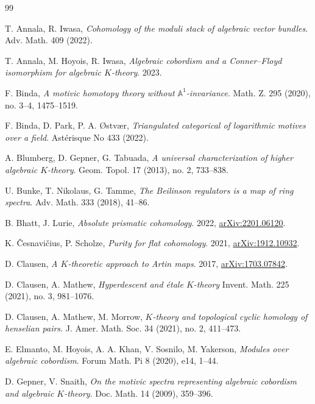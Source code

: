 \documentclass{amsart}
\theoremstyle{plain}
\theoremstyle{definition}
\theoremstyle{remark}
\numberwithin{equation}{theorem}
\newcommand{\mbb}[1]{\mathbb{#1}}
\begin{document}
\begin{thebibliography}{99}

T. Annala, R. Iwasa,
\textit{Cohomology of the moduli stack of algebraic vector bundles}.
Adv. Math. 409 (2022).

T. Annala, M. Hoyois, R. Iwasa,
\textit{Algebraic cobordism and a Conner--Floyd isomorphism for algebraic $K$-theory}. 2023.

F. Binda,
\textit{A motivic homotopy theory without $\mbb{A}^1$-invariance}.
Math. Z. 295 (2020), no. 3--4, 1475--1519.

F. Binda, D. Park, P. A. \O{}stv\ae{}r,
\textit{Triangulated categorical of logarithmic motives over a field}.
Ast\'erisque No 433 (2022). 

A. Blumberg, D. Gepner, G. Tabuada,
\textit{A universal characterization of higher algebraic $K$-theory}.
Geom. Topol. 17 (2013), no. 2, 733--838.

U. Bunke, T. Nikolaus, G. Tamme,
\textit{The Beilinson regulators is a map of ring spectra}.
Adv. Math. 333 (2018), 41--86.

B. Bhatt, J. Lurie,
\textit{Absolute prismatic cohomology}.
2022, \href{https://arxiv.org/abs/2201.06120}{arXiv:2201.06120}.

K. \v{C}esnavi\v{c}ius, P. Scholze,
\textit{Purity for flat cohomology}.
2021, \href{https://arxiv.org/abs/1912.10932}{arXiv:1912.10932}.

D. Clausen,
\textit{A $K$-theoretic approach to Artin maps}.
2017, \href{https://arxiv.org/abs/1703.07842}{arXiv:1703.07842}.

D. Clausen, A. Mathew,
\textit{Hyperdescent and \'etale $K$-theory}
Invent. Math. 225 (2021), no. 3, 981--1076.

D. Clausen, A. Mathew, M. Morrow,
\textit{$K$-theory and topological cyclic homology of henselian pairs}.
J. Amer. Math. Soc. 34 (2021), no. 2, 411--473.

E. Elmanto, M. Hoyois, A. A. Khan, V. Sosnilo, M. Yakerson,
\textit{Modules over algebraic cobordism}.
Forum Math. Pi 8 (2020), e14, 1--44.

D. Gepner, V. Snaith,
\textit{On the motivic spectra representing algebraic cobordism and algebraic $K$-theory}.
Doc. Math. 14 (2009), 359--396.


\end{thebibliography}
\end{document}
